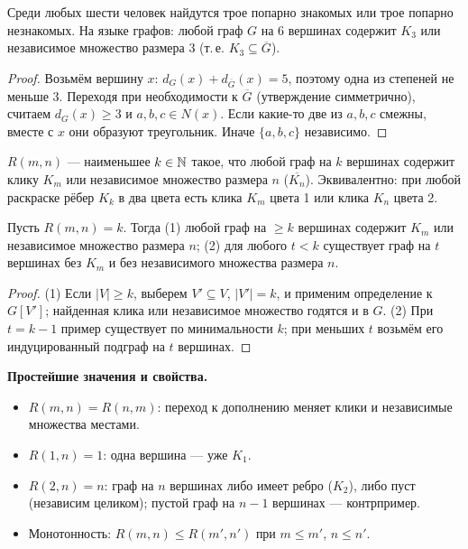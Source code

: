 \begin{theorem}
Среди любых шести человек найдутся трое попарно знакомых или трое попарно
незнакомых. На языке графов: любой граф \(G\) на 6 вершинах содержит \(K_3\)
или независимое множество размера 3 (т.\,е. \(K_3\subseteq\overline G\)).
\end{theorem}
\begin{proof}
Возьмём вершину \(x\): \(d_G(x)+d_{\overline G}(x)=5\), поэтому одна из степеней
не меньше 3. Переходя при необходимости к \(\overline G\) (утверждение симметрично),
считаем \(d_G(x)\ge3\) и \(a,b,c\in N(x)\). Если какие-то две из \(a,b,c\) смежны,
вместе с \(x\) они образуют треугольник. Иначе \(\{a,b,c\}\) независимо.
\end{proof}


\begin{definition}
\(R(m,n)\) — наименьшее \(k\in\mathbb N\) такое, что любой граф на \(k\) вершинах содержит
клику \(K_m\) или независимое множество размера \(n\) (\(\overline{K_n}\)).
Эквивалентно: при любой раскраске рёбер \(K_k\) в два цвета есть клика \(K_m\)
цвета 1 или клика \(K_n\) цвета 2.
\end{definition}
\begin{lemma}
Пусть \(R(m,n)=k\). Тогда (1) любой граф на \(\ge k\) вершинах содержит \(K_m\) или
независимое множество размера \(n\); (2) для любого \(t<k\) существует граф на \(t\)
вершинах без \(K_m\) и без независимого множества размера \(n\).
\end{lemma}
\begin{proof}
(1) Если \(|V|\ge k\), выберем \(V'\subseteq V\), \(|V'|=k\), и применим определение к
\(G[V']\); найденная клика или независимое множество годятся и в \(G\).
(2) При \(t=k-1\) пример существует по минимальности \(k\); при меньших \(t\) возьмём
его индуцированный подграф на \(t\) вершинах.
\end{proof}

\begin{tcolorbox}[colback=cbGrayBack,colframe=cbGray!55]
\textbf{Простейшие значения и свойства.}
\begin{itemize}\tightlist
\item \(R(m,n)=R(n,m)\): переход к дополнению меняет клики и независимые множества местами.
\item \(R(1,n)=1\): одна вершина — уже \(K_1\).
\item \(R(2,n)=n\): граф на \(n\) вершинах либо имеет ребро (\(K_2\)), либо пуст
  (независим целиком); пустой граф на \(n-1\) вершинах — контрпример.
\item Монотонность: \(R(m,n)\le R(m',n')\) при \(m\le m'\), \(n\le n'\).
\end{itemize}
\end{tcolorbox}

